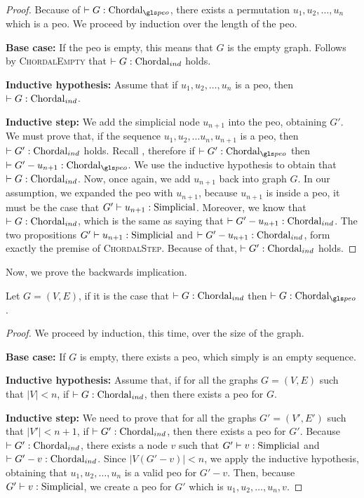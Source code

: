 \begin{proof}
    Because of $\chordalpeo{G}$, there exists a permutation $u_1, u_2, \dots, u_n$ which is a \gls{peo}. We proceed by induction over the length of the \gls{peo}.

    \medskip

    \textbf{Base case:}
    If the \gls{peo} is empty, this means that $G$ is the empty graph. Follows by \textsc{ChordalEmpty} that $\chordalind{G}$ holds.

    \medskip

    \textbf{Inductive hypothesis:}
    Assume that if $u_1, u_2, \dots, u_n$ is a \gls{peo}, then $\chordalind{G}$.

    \medskip

    \textbf{Inductive step:}
    We add the simplicial node $u_{n+1}$ into the \gls{peo}, obtaining $G'$. We must prove that, if the sequence $u_1, u_2, \dots u_n, u_{n+1}$ is a \gls{peo}, then $\chordalind{G'}$ holds.
    Recall , therefore if $\chordalpeo{G'}$ then $\chordalpeo{G' - u_{n+1}}$. We use the inductive hypothesis to obtain that $\chordalind{G}$. Now, once again, we add $u_{n+1}$ back into graph $G$. In our assumption, we expanded the \gls{peo} with $u_{n+1}$, because $u_{n+1}$ is inside a \gls{peo}, it must be the case that $\simplicial{u_{n+1}}{G'}$. Moreover, we know that $\chordalind{G}$, which is the same as saying that $\chordalind{G' - u_{n+1}}$. The two propositions $\simplicial{u_{n+1}}{G'}$ and $\chordalind{G' - u_{n+1}}$, form exactly the premise of \textsc{ChordalStep}. Because of that, $\chordalind{G'}$ holds.
\end{proof}

Now, we prove the backwards implication.

\begin{lemma}\label{lem:chordal21}
    Let $G = (V, E)$, if it is the case that $\chordalind{G}$ then $\chordalpeo{G}$.
\end{lemma}
\begin{proof}
    We proceed by induction, this time, over the size of the graph.

    \textbf{Base case:}
    If $G$ is empty, there exists a \gls{peo}, which simply is an empty sequence.

    \medskip

    \textbf{Inductive hypothesis:}
    Assume that, if for all the graphs $G = (V, E)$ such that $|V| < n$, if $\chordalind{G}$, then there exists a \gls{peo} for $G$.

    \medskip

    \textbf{Inductive step:}
    We need to prove that for all the graphs $G' = (V', E')$ such that $|V'| < n+1$, if $\chordalind{G'}$, then there exists a \gls{peo} for $G'$.
    Because $\chordalind{G'}$, there exists a node $v$ such that $\simplicial{v}{G'}$ and $\chordalind{G' - v}$. Since $|V(G' - v)| < n$, we apply the inductive hypothesis, obtaining that $u_1, u_2, \dots, u_n$ is a valid \gls{peo} for $G' - v$. Then, because $\simplicial{v}{G'}$, we create a \gls{peo} for $G'$ which is $u_1, u_2, \dots, u_n, v$.
\end{proof}

